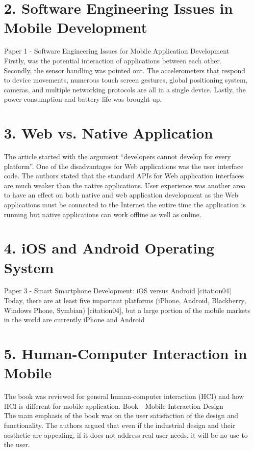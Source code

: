 \documentclass{article}
\begin{document}
\section{2. Software Engineering Issues in Mobile Development }
Paper 1 - Software Engineering Issues for Mobile Application Development 
Firstly, was the potential interaction of applications between each other. Secondly, the sensor handling was pointed out. The accelerometers that respond to device movements, numerous touch screen gestures, global positioning system, cameras, and multiple networking protocols are all in a single device. Lastly, the power consumption and battery life was brought up. 
\section{3. Web vs. Native Application}
The article started with the argument “developers cannot develop for every platform”. One of the disadvantages for Web applications was the user interface code. The authors stated that the standard APIs for Web application interfaces are much weaker than the native applications. User experience was another area to have an effect on both native and web application development as the Web applications must be connected to the Internet the entire time the application is running but native applications can work offline as well as online.
\section{4. iOS and Android Operating System }
Paper 3 - Smart Smartphone Development: iOS versus Android [citation04] 
Today, there are at least five important platforms (iPhone, Android, Blackberry, Windows Phone, Symbian) [citation04], but a large portion of the mobile markets in the world are currently iPhone and Android 
\section{5. Human-Computer Interaction in Mobile }
The book was reviewed for general human-computer interaction (HCI) and how HCI is different for mobile application. 
Book - Mobile Interaction Design \cite{citation04} \\
The main emphasis of the book was on the user satisfaction of the design and functionality. The authors argued that even if the industrial design and their aesthetic are appealing, if it does not address real user needs, it will be no use to the user. 
\end{document}
